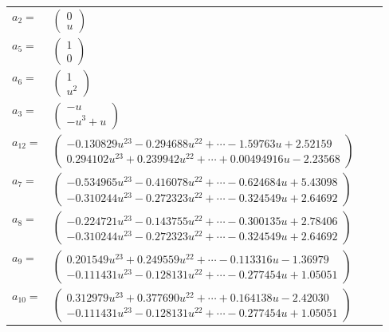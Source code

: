 \documentclass[1p]{elsarticle_modified}
\theoremstyle{definition}
\begin{document}
\begin{tabular}{m{7pt} m{180pt} m{7pt} m{180pt} }
\flushright $a_{2}=$&$\begin{pmatrix}0\\u\end{pmatrix}$ \\
\flushright $a_{5}=$&$\begin{pmatrix}1\\0\end{pmatrix}$ \\
\flushright $a_{6}=$&$\begin{pmatrix}1\\u^2\end{pmatrix}$ \\
\flushright $a_{3}=$&$\begin{pmatrix}- u\\- u^3+u\end{pmatrix}$ \\
\flushright $a_{12}=$&$\begin{pmatrix}-0.130829 u^{23}-0.294688 u^{22}+\cdots-1.59763 u+2.52159\\0.294102 u^{23}+0.239942 u^{22}+\cdots+0.00494916 u-2.23568\end{pmatrix}$ \\
\flushright $a_{7}=$&$\begin{pmatrix}-0.534965 u^{23}-0.416078 u^{22}+\cdots-0.624684 u+5.43098\\-0.310244 u^{23}-0.272323 u^{22}+\cdots-0.324549 u+2.64692\end{pmatrix}$ \\
\flushright $a_{8}=$&$\begin{pmatrix}-0.224721 u^{23}-0.143755 u^{22}+\cdots-0.300135 u+2.78406\\-0.310244 u^{23}-0.272323 u^{22}+\cdots-0.324549 u+2.64692\end{pmatrix}$ \\
\flushright $a_{9}=$&$\begin{pmatrix}0.201549 u^{23}+0.249559 u^{22}+\cdots-0.113316 u-1.36979\\-0.111431 u^{23}-0.128131 u^{22}+\cdots-0.277454 u+1.05051\end{pmatrix}$ \\
\flushright $a_{10}=$&$\begin{pmatrix}0.312979 u^{23}+0.377690 u^{22}+\cdots+0.164138 u-2.42030\\-0.111431 u^{23}-0.128131 u^{22}+\cdots-0.277454 u+1.05051\end{pmatrix}$ \\

\end{tabular}
\end{document}
